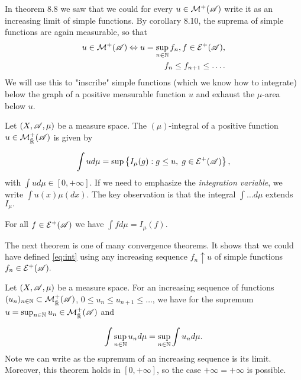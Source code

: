 In theorem 8.8 we saw that we could for every $u\in\mathcal{M}^+(\mathscr{A})$ write it as an increasing limit
of simple functions. By corollary 8.10, the suprema of simple functions are again measurable, so that 
\begin{align*}
    u\in\mathcal{M}^+(\mathscr{A})\Leftrightarrow u=\sup_{n\in\mathbb{N}} f_n, f\in\mathcal{E}^+(\mathscr{A}), \\f_n\leq f_{n+1}\leq\ldots.
\end{align*}
We will use this to "inscribe" simple functions (which we know how to integrate) below the graph of a 
positive measurable function $u$ and exhaust the $\mu$-area below $u$.
\begin{definition}
    Let $(X,\mathscr{A},\mu)$ be a measure space. The $(\mu)$-integral of a positive function $u\in\mathcal{M}_{\bar{\mathbb{R}}}^+(\mathscr{A})$ is given by 

    \begin{equation}
        \label{eq:int}
        \int ud\mu=\sup\left\{ I_\mu(g):g\leq u,\hspace{1mm} g\in\mathcal{E}^+(\mathscr{A}) \right\},
    \end{equation}
    with \(\int ud\mu\in[0,+\infty]\).
    If we need to emphasize the \textit{integration variable}, we write $\int u(x)\mu(dx).$
    The key observation is that the integral $\int\ldots d\mu$ extends $I_\mu.$

\end{definition}
\begin{lemma}
    For all $f\in\mathcal{E}^+(\mathscr{A})$ we have $\int fd\mu = I_\mu(f).$
\end{lemma}

The next theorem is one of many convergence theorems. It shows that we could have defined \ref*{eq:int} using any increasing
sequence $f_n\uparrow u$ of simple functions $f_n\in\mathcal{E}^+(\mathscr{A}).$

\begin{theorem}
    Let $(X,\mathscr{A},\mu)$ be a measure space. For an increasing sequence of functions 
    $(u_n)_{n\in\mathbb{N}}\subset \mathcal{M}_{\bar{\mathbb{R}}}^+(\mathscr{A})$, $0\leq u_n\leq u_{n+1}\leq\ldots$, we have for the supremum $u=\sup_{n\in\mathbb{N}} u_n\in\mathcal{M}_{\bar{\mathbb{R}}}^+(\mathscr{A})$
    and 

    \begin{align}
        \int \sup_{n\in\mathbb{N}} u_nd\mu =\sup_{n\in\mathbb{N}} \int  u_nd\mu.
    \end{align}
Note we can write  as the supremum of an increasing sequence
is its limit. Moreover, this theorem holds in $[0,+\infty]$, so the case $+\infty = +\infty$ is possible. 
\end{theorem}

